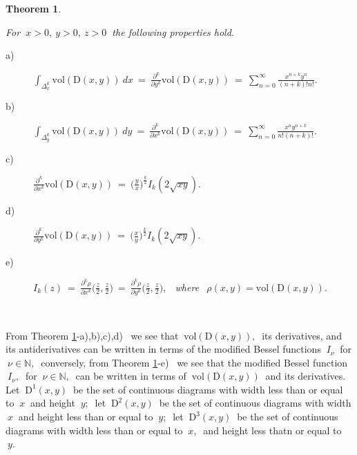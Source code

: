 \documentclass[10pt,leqeq]{article}
\newtheorem{thm}{Theorem}%
\begin{document}
\begin{thm}\label{t3}
{\em  For $\ x>0, \ y> 0, \ z>0 \ $ the following properties hold.
\begin{description}
   

  \item[a)] $  \displaystyle \int_{\Delta^k_x}\mathrm{vol}(\mathrm{D}(x,y))\ dx \ = \   \frac{\partial^k}{\partial y^k}\mathrm{vol}(\mathrm{D}(x,y)) \ = \
      \sum_{n=0}^{\infty}\frac{x^{n+k}y^{n}}{(n+k)!n!} .$
      
  \item[b)] $  \displaystyle
      \int_{\Delta^k_y} \mathrm{vol}(\mathrm{D}(x,y))\ dy\  = \ \frac{\partial^k}{\partial x^k}\mathrm{vol}(\mathrm{D}(x,y)) \ = \ \sum_{n=0}^{\infty}\frac{x^ny^{n+k}}{n!(n+k)!}. $

\item[c)] $ \displaystyle \frac{\partial^k}{\partial x^k}\mathrm{vol}(\mathrm{D}(x,y)) \ = \ \bigg(\frac{y}{x}\bigg)^{\frac{k}{2}} I_k(2\sqrt{xy}). $
    
    \item[d)] $ \displaystyle 
     \frac{\partial^k}{\partial y^k}\mathrm{vol}(\mathrm{D}(x,y)) \ = \ \bigg(\frac{x}{y}\bigg)^{\frac{k}{2}} I_k(2\sqrt{xy}). $

\item[e)]$\displaystyle I_k(z) \  = \ \frac{\partial^k\rho}{\partial x^k}\bigg(\frac{z}{2},\frac{z}{2}\bigg) \ = \ \frac{\partial^k\rho}{\partial y^k}\bigg(\frac{z}{2},\frac{z}{2}\bigg) , \ \ $ where $\ \ \rho(x,y)  =  \mathrm{vol}(\mathrm{D}(x,y)).\ $ 
\end{description}
}
\end{thm}

\

From Theorem \ref{t3}-a),b),c),d) \ we see that $ \ \mathrm{vol}(\mathrm{D}(x,y)), \  $ its derivatives, and its antiderivatives can be written in terms of the modified Bessel functions $\ I_{\nu} \ $ for $\ \nu \in \mathbb{N} ,\ $ conversely, from Theorem \ref{t3}-e) \ we see that the modified Bessel function
$\ I_{\nu}, \ $ for $\ \nu \in \mathbb{N}, \ $  can be written in terms of $ \ \mathrm{vol}(\mathrm{D}(x,y)) \ $ and its derivatives.\\

Let $\ \mathrm{D}^{1}(x,y) \ $ be the set of continuous diagrams
with width less than or equal to  $\ x \ $ and height $\ y ; \ $
let $\ \mathrm{D}^{2}(x,y) \ $ be the set of continuous diagrams
with width $\ x \ $ and height less than or equal to $\ y ; \ $
let $\ \mathrm{D}^{3}(x,y) \ $ be the set of continuous diagrams
with width less than or equal to  $\ x, \ $ and height less thatn or 
equal to $\ y . \ $\\
\end{document}
